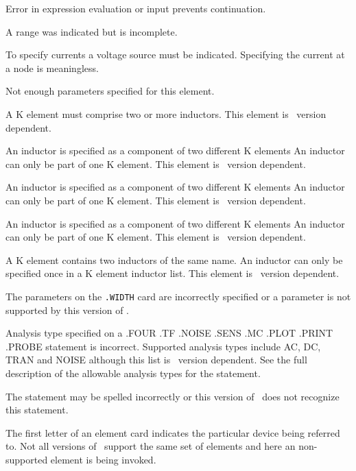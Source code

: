 Error in expression evaluation or input prevents continuation.

A range was indicated but is incomplete.

To specify currents a voltage source must be indicated.  Specifying the
current at a node is meaningless.

Not enough parameters specified for this element.

A K element must comprise two or more inductors.
This element is \justspice\ version dependent.

An inductor is specified as a component of two different K elements
An inductor can only be part of one K element.
This element is \justspice\ version dependent.

An inductor is specified as a component of two different K elements
An inductor can only be part of one K element.
This element is \justspice\ version dependent.

An inductor is specified as a component of two different K elements
An inductor can only be part of one K element.
This element is \justspice\ version dependent.

A K element contains two inductors of the same name.
An inductor can only be specified once in a K element inductor list.
This element is \justspice\ version dependent.

The parameters on the {\tt .WIDTH} card are incorrectly specified
or a parameter is not supported by this version of \spice.

Analysis type specified on a .FOUR .TF .NOISE .SENS .MC .PLOT .PRINT .PROBE
statement is incorrect.  Supported analysis types include AC, DC, TRAN and NOISE
although this list is \justspice\ version dependent.
See the full description of the allowable analysis types for the
statement.

The statement may be spelled incorrectly or
this version of \spice\ does not recognize this statement.

The first letter of an element card indicates the particular device being
referred to.  Not all versions of \justspice\ support the same set of elements
and here an non-supported element is being invoked.

